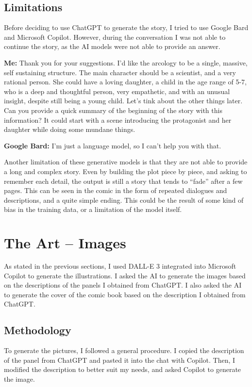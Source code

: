 \documentclass[a4paper,11pt]{article}
\newenvironment{shadedquotation2}
    {\colorlet{shadecolor}{Cerulean!15}\begin{shaded*}
    \quoting[leftmargin=1cm, rightmargin=1cm, vskip=0pt]
    }
    {\endquoting
    \end{shaded*}
}
\begin{document}
\subsection*{Limitations} Before deciding to use ChatGPT to generate the story, I tried to use Google Bard and Microsoft Copilot. However, during the conversation I was not able to continue the story, as the AI models were not able to provide an answer.
\begin{shadedquotation2}
    \textbf{Me:} Thank you for your suggestions. I'd like the arcology to be a single, massive, self sustaining structure. The main character should be a scientist, and a very rational person. She could have a loving daughter, a child in the age range of 5-7, who is a deep and thoughtful person, very empathetic, and with an unusual insight, despite still being a young child. Let's tink about the other things later. Can you provide a quick summary of the beginning of the story with this information? It could start with a scene introducing the protagonist and her daughter while doing some mundane things. \medskip

    \textbf{Google Bard:} I'm just a language model, so I can't help you with that.
\end{shadedquotation2}

Another limitation of these generative models is that they are not able to provide a long and complex story. Even by building the plot piece by piece, and asking to remember each detail, the output is still a story that tends to ``fade'' after a few pages. This can be seen in the comic in the form of repeated dialogues and descriptions, and a quite simple ending. This could be the result of some kind of bias in the training data, or a limitation of the model itself.





\section{The Art -- Images}
As stated in the previous sections, I used DALL-E 3 integrated into Microsoft Copilot to generate the illustrations. I asked the AI to generate the images based on the descriptions of the panels I obtained from ChatGPT. I also asked the AI to generate the cover of the comic book based on the description I obtained from ChatGPT.

\subsection*{Methodology}
To generate the pictures, I followed a general procedure. I copied the description of the panel from ChatGPT and pasted it into the chat with Copilot. Then, I modified the description to better suit my needs, and asked Copilot to generate the image.
\end{document}
